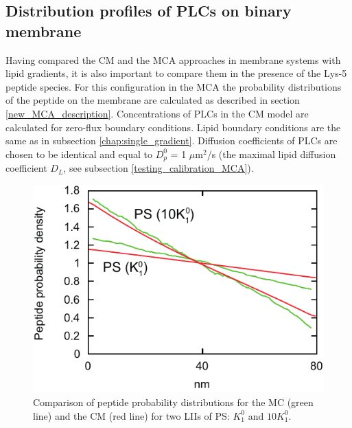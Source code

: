 \subsection{Distribution profiles of PLCs on binary membrane}

Having compared the CM and the MCA approaches in membrane systems with lipid gradients, it is also important to compare them in the presence of the Lys-5 peptide species. For this configuration in the MCA the probability distributions of the peptide on the membrane are calculated as described in section \ref{new_MCA_description}. Concentrations of PLCs in the CM model are calculated for zero-flux boundary conditions. Lipid boundary conditions are the same as in subsection \ref{chap:single_gradient}. Diffusion coefficients of PLCs are chosen to be identical and equal to $D_p^0$ = 1 $\mu$m$^2$/s (the maximal lipid diffusion coefficient $D_L$, see subsection \ref{testing_calibration_MCA}).

\begin{figure}[!ht]
\centering
  \includegraphics[scale=1.03]{../figures/peptide_grad1.pdf}

\caption[Comparison of CM and MCA for peptide probability distributions]{Comparison of peptide probability distributions for the MC (green line) and the CM (red line) for two LIIs of PS: $K_1^0$ and $10 K_1^0$.}
\label{fig:peptide_grad1}
\end{figure}

